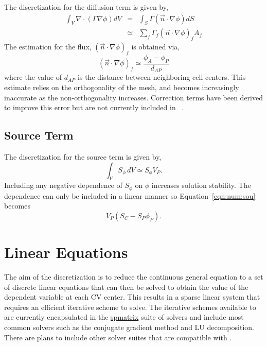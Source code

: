 The discretization for the diffusion term is given by,
\begin{eqnarray}
\int_V \nabla \cdot (\Gamma\nabla\phi) dV & = & \int_S \Gamma (\vec{n} \cdot \nabla\phi) dS \\
& \simeq & \sum_f \Gamma_f (\vec{n} \cdot \nabla\phi)_f A_f
\label{eqn:num:dif}
\end{eqnarray}
The estimation for the flux, $(\vec{n} \cdot \nabla\phi)_f$ is obtained via,
\begin{equation}
(\vec{n} \cdot \nabla\phi)_f \simeq \frac{\phi_A-\phi_P}{d_{AP}}
\end{equation}
where the value of $d_{AP}$ is the distance between neighboring cell
centers.  This estimate relies on the orthogonality of the mesh, and
becomes increasingly inaccurate as the non-orthogonality increases.
Correction terms have been derived to improve this error but are not
currently included in \FiPy{}~\cite{croftphd}.

\subsection{Source Term}

The discretization for the source term is given by, 
\begin{equation}
\int_V S_{\phi}\,dV \simeq S_\phi V_P.
\label{eqn:num:sou}
\end{equation}
Including any negative dependence of $S_\phi$ on $\phi$ increases
solution stability. The dependence can only be included in a linear
manner so Equation~\eqref{eqn:num:sou} becomes
\begin{equation}
V_P (S_C - S_P \phi_P).
\end{equation}

\section{Linear Equations}

The aim of the discretization is to reduce the continuous general
equation to a set of discrete linear equations that can then be solved
to obtain the value of the dependent variable at each CV center. This
results in a sparse linear system that requires an efficient iterative
scheme to solve. The iterative schemes available to \FiPy{} are
currently encapsulated in the \href{#id5}{spmatrix} suite of solvers
and include most common solvers such as the conjugate gradient method
and LU decomposition. There are plans to include other solver suites
that are compatible with \Python{}.

